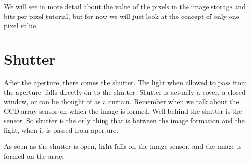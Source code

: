 \documentclass[a4paper]{article}
\begin{document}
We will see in more detail about the value of the pixels in the image storage and bits per pixel tutorial, but for now we will just look at the concept of only one pixel value.
\section{Shutter}
After the aperture, there comes the shutter. The light when allowed to pass from the aperture, falls directly on to the shutter. Shutter is actually a cover, a closed window, or can be thought of as a curtain. Remember when we talk about the CCD array sensor on which the image is formed. Well behind the shutter is the sensor. So shutter is the only thing that is between the image formation and the light, when it is passed from aperture.

As soon as the shutter is open, light falls on the image sensor, and the image is formed on the array.
\end{document}
